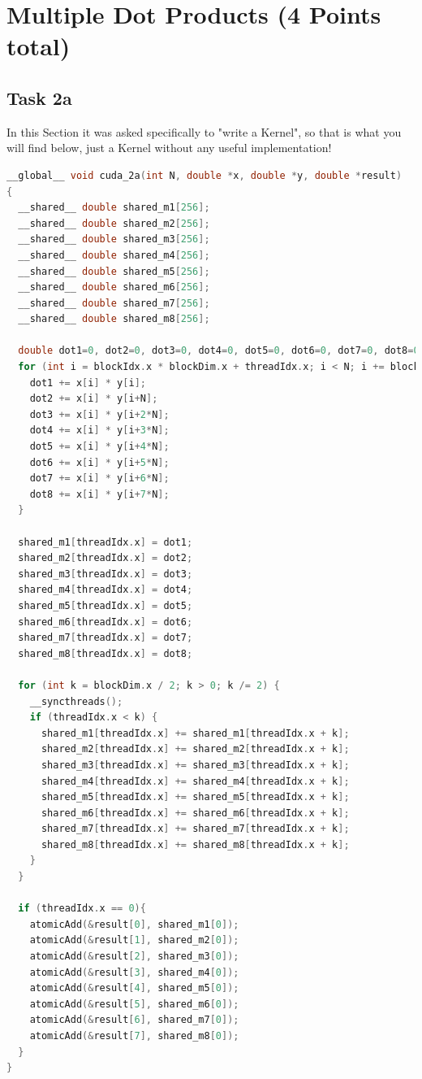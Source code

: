 \section{Multiple Dot Products (4 Points total)}
\subsection{Task 2a}
In this Section it was asked specifically to "write a Kernel", so that is what you will find below, just a Kernel without any useful implementation!

\begin{lstlisting}[language=C++, title=C++ Cuda Code Kernel for 2a]
__global__ void cuda_2a(int N, double *x, double *y, double *result)
{
  __shared__ double shared_m1[256];
  __shared__ double shared_m2[256];
  __shared__ double shared_m3[256];
  __shared__ double shared_m4[256];
  __shared__ double shared_m5[256];
  __shared__ double shared_m6[256];
  __shared__ double shared_m7[256];
  __shared__ double shared_m8[256];
 
  double dot1=0, dot2=0, dot3=0, dot4=0, dot5=0, dot6=0, dot7=0, dot8=0;
  for (int i = blockIdx.x * blockDim.x + threadIdx.x; i < N; i += blockDim.x * gridDim.x) {
    dot1 += x[i] * y[i];
    dot2 += x[i] * y[i+N];
    dot3 += x[i] * y[i+2*N];
    dot4 += x[i] * y[i+3*N];
    dot5 += x[i] * y[i+4*N];
    dot6 += x[i] * y[i+5*N];
    dot7 += x[i] * y[i+6*N];
    dot8 += x[i] * y[i+7*N];
  }
 
  shared_m1[threadIdx.x] = dot1;
  shared_m2[threadIdx.x] = dot2;
  shared_m3[threadIdx.x] = dot3;
  shared_m4[threadIdx.x] = dot4;
  shared_m5[threadIdx.x] = dot5;
  shared_m6[threadIdx.x] = dot6;
  shared_m7[threadIdx.x] = dot7;
  shared_m8[threadIdx.x] = dot8;

  for (int k = blockDim.x / 2; k > 0; k /= 2) {
    __syncthreads();
    if (threadIdx.x < k) {
      shared_m1[threadIdx.x] += shared_m1[threadIdx.x + k];
      shared_m2[threadIdx.x] += shared_m2[threadIdx.x + k];
      shared_m3[threadIdx.x] += shared_m3[threadIdx.x + k];
      shared_m4[threadIdx.x] += shared_m4[threadIdx.x + k];
      shared_m5[threadIdx.x] += shared_m5[threadIdx.x + k];
      shared_m6[threadIdx.x] += shared_m6[threadIdx.x + k];
      shared_m7[threadIdx.x] += shared_m7[threadIdx.x + k];
      shared_m8[threadIdx.x] += shared_m8[threadIdx.x + k];
    }
  }
 
  if (threadIdx.x == 0){
    atomicAdd(&result[0], shared_m1[0]);
    atomicAdd(&result[1], shared_m2[0]);
    atomicAdd(&result[2], shared_m3[0]);
    atomicAdd(&result[3], shared_m4[0]);
    atomicAdd(&result[4], shared_m5[0]);
    atomicAdd(&result[5], shared_m6[0]);
    atomicAdd(&result[6], shared_m7[0]);
    atomicAdd(&result[7], shared_m8[0]);
  }
}
\end{lstlisting}

